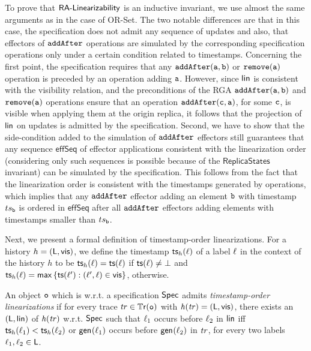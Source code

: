 To prove that $\mathsf{RA\text{-}Linearizability{}}$ is an inductive invariant, we
use almost the same arguments as in the case of OR-Set. The two
notable differences are that in this case, the specification does not admit any sequence of updates and also, that effectors of ${\tt addAfter}$ operations are simulated by the corresponding specification operations only under a certain condition related to timestamps. Concerning the first point, the specification requires that any $\alabelshort[{\tt addAfter}]{a,b}$ or $\alabelshort[{\tt remove}]{a}$ operation is preceded by an operation adding ${\tt a}$. However, since $\mathsf{lin}$ is consistent with the visibility relation, and the preconditions of the RGA $\alabelshort[{\tt addAfter}]{a,b}$ and $\alabelshort[{\tt remove}]{a}$ operations ensure that an operation $\alabelshort[{\tt addAfter}]{c,a}$, for some ${\tt c}$, is visible when applying them at the origin replica, it follows that the projection of $\mathsf{lin}$ on updates is admitted by the specification. Second, we have to show that the side-condition added to the simulation of ${\tt addAfter}$ effectors still guarantees that any sequence $\mathsf{effSeq}$ of effector applications consistent with the linearization order (considering only such sequences is possible because of the $\mathsf{ReplicaStates}$ invariant) can be simulated by the specification. This follows from the fact that the linearization order is consistent with the timestamps generated by operations, which implies that any ${\tt addAfter}$ effector adding an element ${\tt b}$ with timestamp $ts_{\tt b}$ is ordered in $\mathsf{effSeq}$ after all ${\tt addAfter}$ effectors adding elements with timestamps smaller than $ts_{\tt b}$.

Next, we present a formal definition of timestamp-order linearizations. For a history ${h}=(\mathsf{L},\mathsf{vis})$, we define the timestamp $\mathsf{ts}_{{h}}(\ell)$ of a label $\ell$ in the context of the history $h$ to be $\mathsf{ts}_{{h}}(\ell)=\mathsf{ts}(\ell)$ if $\mathsf{ts}(\ell)\neq\bot$ and $\mathsf{ts}_{{h}}(\ell)=\mathsf{max}\, \{\mathsf{ts}(\ell'):(\ell',\ell)\in \mathsf{vis} \}$, otherwise.

\begin{definition}
An object $\mathtt{o}$ which is \crdtlinearizable{} w.r.t. a specification $\mathsf{Spec}$ admits \emph{timestamp-order linearizations} if for every trace $\mathit{tr}\in\mathbb{T}\mathsf{r}(\mathtt{o})$ with $\mathit{h}({\mathit{tr})}=(\mathsf{L},\mathsf{vis})$, there exists an \crdtlinearization{} $(\mathsf{L},\mathsf{lin})$ of $\mathit{h}({\mathit{tr})}$ w.r.t. $\mathsf{Spec}$ such that $\ell_1$ occurs before $\ell_2$ in $\mathsf{lin}$ iff $\mathsf{ts}_{{h}}(\ell_1) < \mathsf{ts}_{{h}}(\ell_2)$ or $\mathsf{gen}_{}(\ell_1)$ occurs before $\mathsf{gen}_{}(\ell_2)$ in $\mathit{tr}$, for every two labels $\ell_1,\ell_2\in\mathsf{L}$.
\end{definition}


